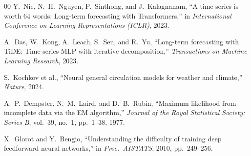 \documentclass[conference, 10pt]{IEEEtran}
\begin{document}
\begin{thebibliography}{00}
Y.~Nie, N.~H.~Nguyen, P.~Sinthong, and J.~Kalagnanam, ``A time series is worth 64 words: Long-term forecasting with Transformers,'' in \textit{International Conference on Learning Representations (ICLR)}, 2023.

A.~Das, W.~Kong, A.~Leach, S.~Sen, and R.~Yu, ``Long-term forecasting with TiDE: Time-series MLP with iterative decomposition,'' \textit{Transactions on Machine Learning Research}, 2023.

S.~Kochkov et al., ``Neural general circulation models for weather and climate,'' \textit{Nature}, 2024.

A.~P.~Dempster, N.~M.~Laird, and D.~B.~Rubin, ``Maximum likelihood from incomplete data via the EM algorithm,'' \textit{Journal of the Royal Statistical Society: Series B}, vol.~39, no.~1, pp.~1--38, 1977.

X.~Glorot and Y.~Bengio, ``Understanding the difficulty of training deep feedforward neural networks,'' in \textit{Proc.\ AISTATS}, 2010, pp.~249--256.

\end{thebibliography}
\end{document}
